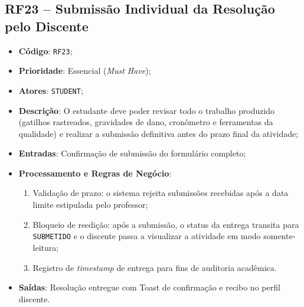 \subsection{RF23 -- Submissão Individual da Resolução pelo Discente}
\begin{itemize}
    \item \textbf{Código}: \texttt{RF23};
    \item \textbf{Prioridade}: Essencial (\textit{Must Have});
    \item \textbf{Atores}: \texttt{STUDENT};
    \item \textbf{Descrição}: O estudante deve poder revisar todo o trabalho produzido (gatilhos rastreados, gravidades de dano, cronômetro e ferramentas da qualidade) e realizar a submissão definitiva antes do prazo final da atividade;
    \item \textbf{Entradas}: Confirmação de submissão do formulário completo;
    \item \textbf{Processamento e Regras de Negócio}:
    \begin{enumerate}
        \item Validação de prazo: o sistema rejeita submissões recebidas após a data limite estipulada pelo professor;
        \item Bloqueio de reedição: após a submissão, o status da entrega transita para \texttt{SUBMETIDO} e o discente passa a visualizar a atividade em modo somente-leitura;
        \item Registro de \textit{timestamp} de entrega para fins de auditoria acadêmica.
    \end{enumerate}
    \item \textbf{Saídas}: Resolução entregue com Toast de confirmação e recibo no perfil discente.
\end{itemize}

